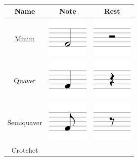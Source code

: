             \begin{table}[h]
                \centering
                \begin{tabular}{| c | c | c |}
                    \hline
                    Name & Note & Rest \\ \hline
                    Minim& 
                            \includegraphics[width=20mm]{./assets/half.png}
                            &
                            \includegraphics[width=20mm]{./assets/halfrest.png} \\ \hline
                    Quaver&
                            \includegraphics[width=20mm]{./assets/4er.png}
                            &
                            \includegraphics[width=20mm]{./assets/4errest.png} \\ \hline
                    Semiquaver&
                            \includegraphics[width=20mm]{./assets/8th.png}
                            &
                            \includegraphics[width=20mm]{./assets/8threst.png} \\ \hline
                    Crotchet&

\end{tabular}
\end{table}
